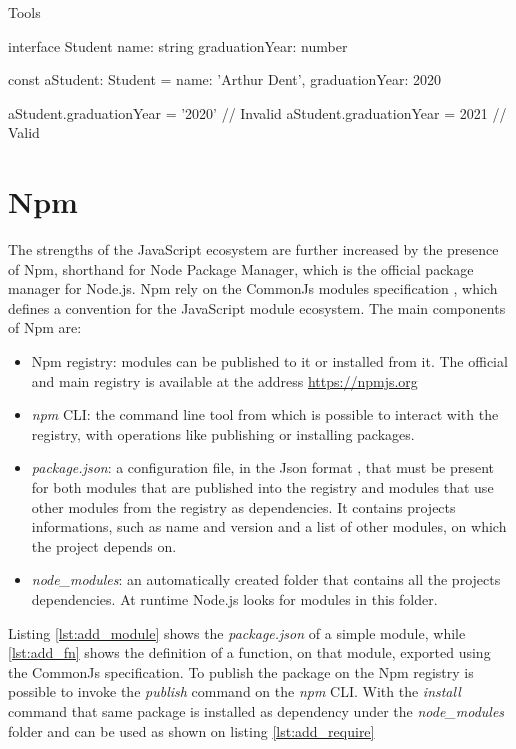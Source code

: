 \begin{chapter}{Tools}
    \bigskip
    \begin{code}[caption=Static type checking on Typescript, label={ts_static}]
interface Student {
  name: string
  graduationYear: number
}

const aStudent: Student = {
  name: 'Arthur Dent',
  graduationYear: 2020
}

aStudent.graduationYear = '2020'    // Invalid
aStudent.graduationYear = 2021      // Valid
    \end{code}

    \section{Npm}
    The strengths of the JavaScript ecosystem are further increased by the presence
    of Npm, shorthand for Node Package Manager, which is the official package manager
    for Node.js. Npm rely on the CommonJs modules specification \cite{common_js},
    which defines a convention for the JavaScript module ecosystem.
    The main components of Npm are:
    \begin{itemize}
        \item Npm registry: modules can be published to it or installed from it.
            The official and main registry is available at the address
            \url{https://npmjs.org}
        \item \textit{npm} CLI: the command line tool from which is possible to interact
            with the registry, with operations like publishing or installing packages.
        \item \textit{package.json}: a configuration file, in the Json format
            \cite{jsoniso}, that must be present for both modules that are published
            into the registry and modules that use other modules from the registry
            as dependencies. It contains projects informations, such as name and
            version and a list of other modules, on which the project depends on.
        \item \textit{node\_modules}: an automatically created folder that contains
            all the projects dependencies. At runtime Node.js looks for modules
            in this folder.
    \end{itemize}

    Listing \ref{lst:add_module} shows the \textit{package.json} of a simple module,
    while \ref{lst:add_fn} shows the definition of a function, on that module,
    exported using the CommonJs specification. To publish the package on the Npm
    registry is possible to invoke the \textit{publish} command on the \textit{npm}
    CLI. With the \textit{install} command that same package is installed as
    dependency under the \textit{node\_modules} folder and can be used as shown
    on listing \ref{lst:add_require}


\end{chapter}
